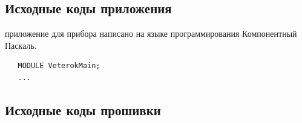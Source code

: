 \documentclass[twoside, 12pt, a4paper]{refart}
\begin{document}
\subsection{Исходные коды приложения}

приложение для прибора написано на языке программирования Компонентный Паскаль.

\begin{verbatim}
   MODULE VeterokMain;
   ...
\end{verbatim}

\subsection{Исходные коды прошивки}


% 


\printindex
\end{document}
